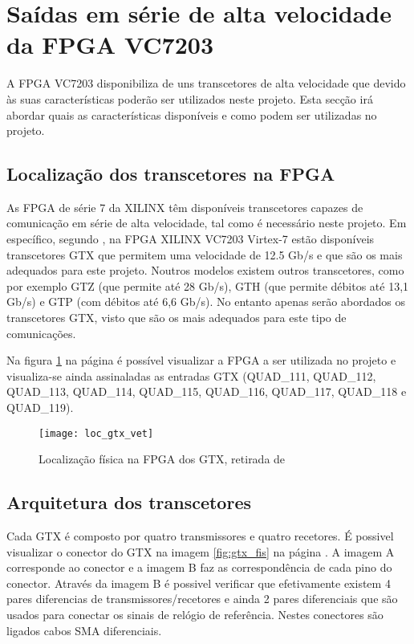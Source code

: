 \section{Saídas em série de alta velocidade da FPGA VC7203}

A FPGA VC7203 disponibiliza de uns transcetores de alta velocidade que devido às suas características poderão ser utilizados neste projeto. Esta secção irá abordar quais as características disponíveis e como podem ser utilizadas no projeto.


\subsection{Localização dos transcetores na FPGA}

As FPGA de série 7 da XILINX têm disponíveis transcetores capazes de comunicação em série de alta velocidade, tal como é necessário neste projeto. Em específico, segundo \cite{R010}, na FPGA XILINX VC7203 Virtex-7 estão disponíveis transcetores GTX que permitem uma velocidade de 12.5 Gb/s e que são os mais adequados para este projeto. Noutros modelos existem outros transcetores, como por exemplo GTZ (que permite até 28 Gb/s), GTH (que permite débitos até 13,1 Gb/s) e GTP (com débitos até 6,6 Gb/s). No entanto apenas serão abordados os transcetores GTX, visto que são os mais adequados para este tipo de comunicações.

Na figura \ref{fig:loc_gtx} na página \pageref{fig:loc_gtx} é possível visualizar a FPGA a ser utilizada no projeto e visualiza-se ainda assinaladas as entradas GTX (QUAD\_111, QUAD\_112, QUAD\_113, QUAD\_114, QUAD\_115, QUAD\_116, QUAD\_117, QUAD\_118 e QUAD\_119).
 
\begin{figure}[h!]
	\begin{center}
		\leavevmode
		\texttt{[image: loc\_gtx\_vet]}
		\caption{Localização física na FPGA dos GTX, retirada de \cite{R008}}
		\label{fig:loc_gtx}
	\end{center}
\end{figure}

\subsection{Arquitetura dos transcetores}

Cada GTX é composto por quatro transmissores e quatro recetores. É possivel visualizar o conector do GTX na imagem \ref{fig:gtx_fis} na página \pageref{fig:gtx_fis}. A imagem A corresponde ao conector e a imagem B faz as correspondência de cada pino do conector. Através da imagem B é possivel verificar que efetivamente existem 4 pares diferencias de transmissores/recetores e ainda 2 pares diferenciais que são usados para conectar os sinais de relógio de referência. Nestes conectores são ligados cabos SMA diferenciais.

